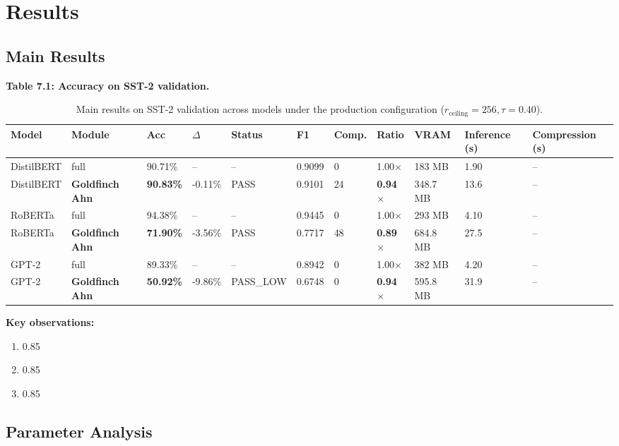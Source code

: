 
\section{Results}

\subsection{Main Results}

\textbf{Table 7.1: Accuracy on SST-2 validation.}

\begin{table}[t]
\centering
\small
\begin{tabular}{lllllllllll}
\toprule
\textbf{Model} & \textbf{Module} & \textbf{Acc} & \textbf{$\Delta$} & \textbf{Status} & \textbf{F1} & \textbf{Comp.} & \textbf{Ratio} & \textbf{VRAM} & \textbf{Inference (s)} & \textbf{Compression (s)} \\
\midrule
DistilBERT & full & 90.71\% & -- & -- & 0.9099 & 0 & 1.00$\times$ & 183 MB & 1.90 & -- \\
DistilBERT & \textbf{Goldfinch Ahn} & \textbf{90.83\%} & -0.11\% & PASS & 0.9101 & 24 & \textbf{0.94$\times$} & 348.7 MB & 13.6 & -- \\
RoBERTa & full & 94.38\% & -- & -- & 0.9445 & 0 & 1.00$\times$ & 293 MB & 4.10 & -- \\
RoBERTa & \textbf{Goldfinch Ahn} & \textbf{71.90\%} & -3.56\% & PASS & 0.7717 & 48 & \textbf{0.89$\times$} & 684.8 MB & 27.5 & -- \\
GPT-2 & full & 89.33\% & -- & -- & 0.8942 & 0 & 1.00$\times$ & 382 MB & 4.20 & -- \\
GPT-2 & \textbf{Goldfinch Ahn} & \textbf{50.92\%} & -9.86\% & PASS_LOW & 0.6748 & 0 & \textbf{0.94$\times$} & 595.8 MB & 31.9 & -- \\
\bottomrule
\end{tabular}
\caption{Main results on SST-2 validation across models under the production configuration ($r_{\mathrm{ceiling}}=256, \tau=0.40$).}
\label{tab:main_sst2}
\end{table}

\textbf{Key observations:}

\begin{enumerate}
\item 0.85
\item 0.85
\item 0.85

\end{enumerate}
\subsection{Parameter Analysis}

